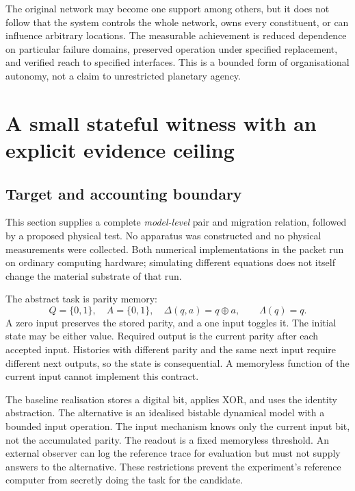 \documentclass[11pt,a4paper]{article}
\theoremstyle{definition}
\theoremstyle{remark}
\begin{document}
The original network may become one support among others, but it does not follow that the system controls the whole network, owns every constituent, or can influence arbitrary locations. The measurable achievement is reduced dependence on particular failure domains, preserved operation under specified replacement, and verified reach to specified interfaces. This is a bounded form of organisational autonomy, not a claim to unrestricted planetary agency.

\section{A small stateful witness with an explicit evidence ceiling}\label{sec:witness}
\subsection{Target and accounting boundary}
This section supplies a complete \emph{model-level} pair and migration relation, followed by a proposed physical test. No apparatus was constructed and no physical measurements were collected. Both numerical implementations in the packet run on ordinary computing hardware; simulating different equations does not itself change the material substrate of that run.

The abstract task is parity memory:
\begin{equation}\label{eq:parity}
 Q=\{0,1\},\quad A=\{0,1\},\quad \Delta(q,a)=q\mathbin{\oplus}a,
 \qquad\Lambda(q)=q.
\end{equation}
A zero input preserves the stored parity, and a one input toggles it. The initial state may be either value. Required output is the current parity after each accepted input. Histories with different parity and the same next input require different next outputs, so the state is consequential. A memoryless function of the current input cannot implement this contract.

The baseline realisation stores a digital bit, applies XOR, and uses the identity abstraction. The alternative is an idealised bistable dynamical model with a bounded input operation. The input mechanism knows only the current input bit, not the accumulated parity. The readout is a fixed memoryless threshold. An external observer can log the reference trace for evaluation but must not supply answers to the alternative. These restrictions prevent the experiment's reference computer from secretly doing the task for the candidate.
\end{document}

